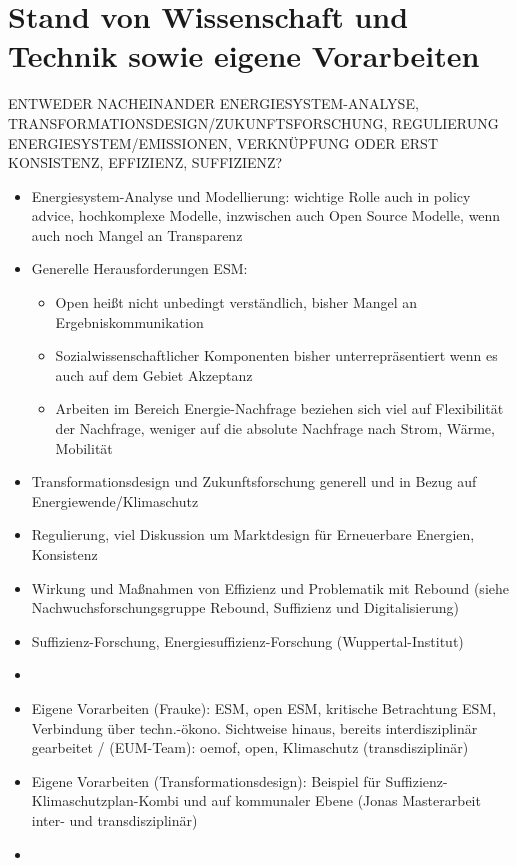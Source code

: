 \documentclass[a4paper,11pt,twoside]{scrartcl}
\begin{document}
\section{Stand von Wissenschaft und Technik sowie eigene Vorarbeiten}
ENTWEDER NACHEINANDER ENERGIESYSTEM-ANALYSE, TRANSFORMATIONSDESIGN/ZUKUNFTSFORSCHUNG, REGULIERUNG ENERGIESYSTEM/EMISSIONEN, VERKNÜPFUNG ODER ERST KONSISTENZ, EFFIZIENZ, SUFFIZIENZ?
\begin{itemize}
    \item Energiesystem-Analyse und Modellierung: wichtige Rolle auch in policy advice, hochkomplexe Modelle, inzwischen auch Open Source Modelle, wenn auch noch Mangel an Transparenz
    \item Generelle Herausforderungen ESM:
    \begin{itemize}
     \item Open heißt nicht unbedingt verständlich, bisher Mangel an Ergebniskommunikation 
     \item Sozialwissenschaftlicher Komponenten bisher unterrepräsentiert wenn es auch auf dem Gebiet Akzeptanz
     \item Arbeiten im Bereich Energie-Nachfrage beziehen sich viel auf Flexibilität der Nachfrage, weniger auf die absolute Nachfrage nach Strom, Wärme, Mobilität
    \end{itemize}
    \item Transformationsdesign und Zukunftsforschung generell und in Bezug auf Energiewende/Klimaschutz
    \item Regulierung, viel Diskussion um Marktdesign für Erneuerbare Energien, Konsistenz
    \item Wirkung und Maßnahmen von Effizienz und Problematik mit Rebound (siehe Nachwuchsforschungsgruppe Rebound, Suffizienz und Digitalisierung)
    \item Suffizienz-Forschung, Energiesuffizienz-Forschung (Wuppertal-Institut)
    \item 
    \item Eigene Vorarbeiten (Frauke): ESM, open ESM, kritische Betrachtung ESM, Verbindung über techn.-ökono. Sichtweise hinaus, bereits interdisziplinär gearbeitet / (EUM-Team): oemof, open, Klimaschutz (transdisziplinär)
    \item Eigene Vorarbeiten (Transformationsdesign): Beispiel für Suffizienz-Klimaschutzplan-Kombi und auf kommunaler Ebene (Jonas Masterarbeit inter- und transdisziplinär)
    \item 
\end{itemize}
\end{document}
